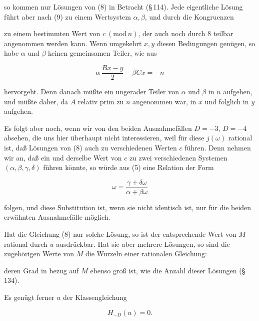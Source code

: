 
so kommen nur  Lösungen von (8) in Betracht
(\S\,114). Jede eigentliche Lösung führt aber nach (9) zu einem
Wertsystem $\alpha, \beta$, und durch die Kongruenzen


zu einem bestimmten Wert von $c\ (\mathrm{mod}\ n)$, der auch noch durch
8 teilbar angenommen werden kann. Wenn umgekehrt $x, y$
diesen Bedingungen genügen, so habe $\alpha$ und $\beta$ keinen gemeinsamen Teiler, wie aus

\[ \alpha\,\dfrac{Bx-y}{2} - \beta Cx = -n \]

hervorgeht. Denn danach müßte ein ungerader Teiler von $\alpha$
und $\beta$ in $n$ aufgehen, und müßte daher, da $A$ relativ prim zu $n$
angenommen war, in $x$ und folglich in $y$ aufgehen.

Es folgt aber noch, wenn wir von den beiden Ausnahmefällen
$D=-3$, $D=-4$ absehen, die uns hier überhaupt
nicht interessieren, weil für diese $j(\omega)$ rational ist, daß  Lösungen von (8) auch zu verschiedenen Werten $c$
führen. Denn nehmen wir an, daß ein und derselbe Wert von $c$
zu zwei verschiedenen Systemen $(\alpha, \beta, \gamma, \delta)$ führen könnte, so
würde aus (5) eine Relation der Form

\[ \omega = \dfrac{\gamma+\delta\omega}{\alpha+\beta\omega} \]

folgen, und diese Substitution ist, wenn sie nicht identisch ist,
nur für die beiden erwähnten Ausnahmefälle möglich.


Hat die Gleichung (8) nur  solche Lösung, so ist der
entsprechende Wert von $M$ rational durch $u$ ausdrückbar. Hat
sie aber mehrere Lösungen, so sind die zugehörigen Werte von $M$
die Wurzeln einer rationalen Gleichung:


deren Grad in bezug auf $M$ ebenso groß ist, wie die Anzahl
dieser Lösungen (\S\,134).

Es genügt ferner $u$ der Klassengleichung

\[ H_{-D}(u) = 0. \]
